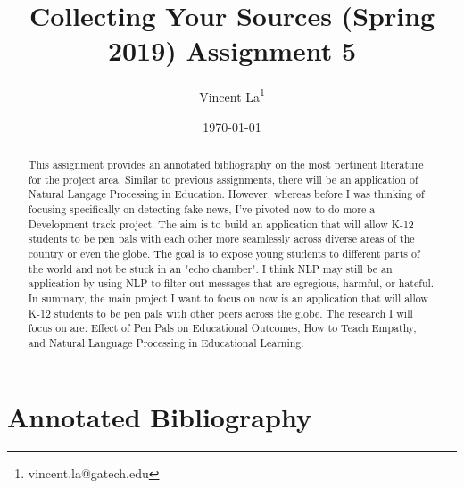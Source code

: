 \documentclass[12pt, final]{article}
\renewcommand{\thefootnote}{$\star$}
\begin{document}
\title{Collecting Your Sources (Spring 2019) Assignment 5}

\date{\today}

\renewcommand{\thefootnote}{$\dag$}
\author{Vincent La\footnote{vincent.la@gatech.edu}}

\maketitle

\begin{abstract}
This assignment provides an annotated bibliography on the most pertinent literature for the project area. Similar to previous assignments, there will be an application of Natural Langage Processing in Education. However, whereas before I was thinking of focusing specifically on detecting fake news, I've pivoted now to do more a Development track project. The aim is to build an application that will allow K-12 students to be pen pals with each other more seamlessly across diverse areas of the country or even the globe. The goal is to expose young students to different parts of the world and not be stuck in an "echo chamber". I think NLP may still be an application by using NLP to filter out messages that are egregious, harmful, or hateful. In summary, the main project I want to focus on now is an application that will allow K-12 students to be pen pals with other peers across the globe. The research I will focus on are: Effect of Pen Pals on Educational Outcomes, How to Teach Empathy, and Natural Language Processing in Educational Learning.
\end{abstract} 

\newpage
\renewcommand{\thefootnote}{\number\value{footnote}} 

\section{Annotated Bibliography}
\end{document}
